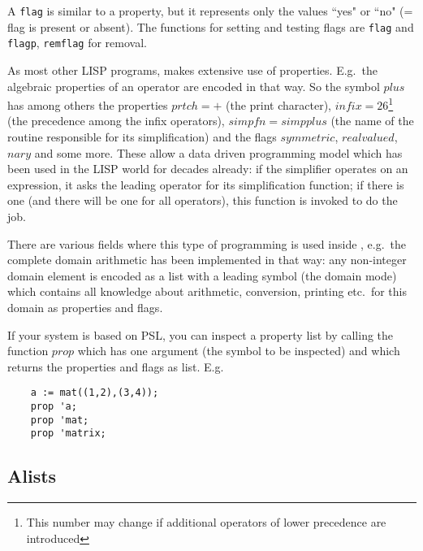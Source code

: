 A {\tt flag} is similar to a property, but
it represents only the values ``yes" or ``no" (= flag is
present or absent). The functions for setting and
testing flags are {\tt flag} and {\tt flagp}, 
{\tt remflag} for removal.

As most other LISP programs, {\reduce} makes extensive use of properties. 
E.g.\  the  algebraic properties of an operator are encoded
in that way. So the symbol $plus$ has among others the {\reduce}
properties $prtch=+$ (the print character), 
$infix=26$\footnote{This number may change if additional operators
of lower precedence are introduced}
(the precedence among the infix operators), $simpfn=simpplus$
(the name of the routine responsible for its simplification)
and the flags $symmetric$, $realvalued$, $nary$ and some more.
These allow a data driven programming model which has been used
in the LISP world for decades already: if the simplifier
operates on an expression, it asks the leading operator for
its simplification function; if there is one (and there will be
one for all operators), this function is invoked to do the job.

There are various fields where this type of programming is used
inside {\reduce}, e.g.\ the complete domain arithmetic has been
implemented in that way: any non-integer domain element is encoded
as a list with a leading symbol (the domain mode) which contains
all knowledge about arithmetic, conversion, printing etc.\  for
this domain as properties and flags.  

If your {\reduce} system is based on PSL, you can inspect a
property list by calling the function $prop$ which  
has one argument (the symbol to be inspected) and which returns
the properties and flags as list. E.g. 
\begin{verbatim}
    a := mat((1,2),(3,4));
    prop 'a;
    prop 'mat;
    prop 'matrix;
\end{verbatim}


\subsection{Alists}

